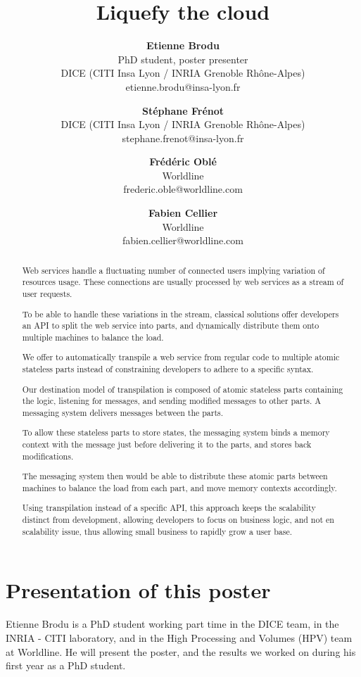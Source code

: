 \documentclass[11pt,twocolumn]{article}
\begin{document}
\begin{multicols}{4}
\title{\textbf{Liquefy the cloud}}
\author{
    \textbf{Etienne Brodu}\\
    PhD student, poster presenter\\
    DICE (CITI Insa Lyon / INRIA Grenoble Rhône-Alpes)\\
    etienne.brodu@insa-lyon.fr
  \and
    \textbf{Stéphane Frénot}\\
    DICE (CITI Insa Lyon / INRIA Grenoble Rhône-Alpes)\\
    stephane.frenot@insa-lyon.fr
  \and
    \textbf{Frédéric Oblé}\\
    Worldline\\
    frederic.oble@worldline.com
  \and
    \textbf{Fabien Cellier}\\
    Worldline\\
    fabien.cellier@worldline.com
}
\date{}
\maketitle
\end{multicols}

\maketitle

\begin{abstract}
Web services handle a fluctuating number of connected users implying variation of resources usage.
These connections are usually processed by web services as a stream of user requests.

To be able to handle these variations in the stream, classical solutions offer developers an API to split the web service into parts, and dynamically distribute them onto multiple machines to balance the load.

We offer to automatically transpile a web service from regular code to multiple atomic stateless parts instead of constraining developers to adhere to a specific syntax.

Our destination model of transpilation is composed of atomic stateless parts containing the logic, listening for messages, and sending modified messages to other parts.
A messaging system delivers messages between the parts.

To allow these stateless parts to store states, the messaging system binds a memory context with the message just before delivering it to the parts, and stores back modifications.

The messaging system then would be able to distribute these atomic parts between machines to balance the load from each part, and move memory contexts accordingly.

Using transpilation instead of a specific API, this approach keeps the scalability distinct from development, allowing developers to focus on business logic, and not en scalability issue, thus allowing small business to rapidly grow a user base.
\end{abstract}

\section*{Presentation of this poster}
Etienne Brodu is a PhD student working part time in the DICE team, in the INRIA - CITI laboratory, and in the High Processing and Volumes (HPV) team at Worldline.
He will present the poster, and the results we worked on during his first year as a PhD student.
\end{document}
